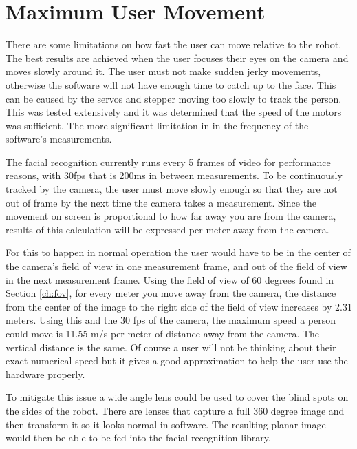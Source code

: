 \section{Maximum User Movement}
There are some limitations on how fast the user can move relative to the robot. The best results are achieved when the user focuses their eyes on the camera and moves slowly around it. The user must not make sudden jerky movements, otherwise the software will not have enough time to catch up to the face. This can be caused by the servos and stepper moving too slowly to track the person. This was tested extensively and it was determined that the speed of the motors was sufficient. The more significant limitation in in the frequency of the software's measurements.

The facial recognition currently runs every 5 frames of video for performance reasons, with 30fps that is 200ms in between measurements. To be continuously tracked by the camera, the user must move slowly enough so that they are not out of frame by the next time the camera takes a measurement. Since the movement on screen is proportional to how far away you are from the camera, results of this calculation will be expressed per meter away from the camera.

For this to happen in normal operation the user would have to be in the center of the camera's field of view in one measurement frame, and out of the field of view in the next measurement frame. Using the field of view of 60 degrees found in Section \ref{ch:fov}, for every meter you move away from the camera, the distance from the center of the image to the right side of the field of view increases by 2.31 meters. Using this and the 30 fps of the camera, the maximum speed a person could move is 11.55 m/s per meter of distance away from the camera. The vertical distance is the same. Of course a user will not be thinking about their exact numerical speed but it gives a good approximation to help the user use the hardware properly.

To mitigate this issue a wide angle lens could be used to cover the blind spots on the sides of the robot. There are lenses that capture a full 360 degree image and then transform it so it looks normal in software. The resulting planar image would then be able to be fed into the facial recognition library.

